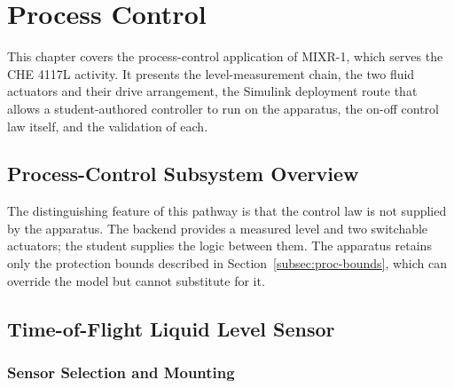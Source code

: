 
\chapter{Process Control}
\label{ch:process}

\ifpdf
    \graphicspath{{Chapter6/Figs/Raster/}{Chapter6/Figs/PDF/}{Chapter6/Figs/}}
\else
    \graphicspath{{Chapter6/Figs/Vector/}{Chapter6/Figs/}}
\fi

This chapter covers the process-control application of MIXR-1, which serves the CHE 4117L activity. It presents the level-measurement chain, the two fluid actuators and their drive arrangement, the Simulink deployment route that allows a student-authored controller to run on the apparatus, the on-off control law itself, and the validation of each.

\section{Process-Control Subsystem Overview}
\label{sec:proc-overview}


The distinguishing feature of this pathway is that the control law is not supplied by the apparatus. The backend provides a measured level and two switchable actuators; the student supplies the logic between them. The apparatus retains only the protection bounds described in Section~\ref{subsec:proc-bounds}, which can override the model but cannot substitute for it.

\section{Time-of-Flight Liquid Level Sensor}
\label{sec:proc-tof}

\subsection{Sensor Selection and Mounting}
\label{subsec:proc-tof-sel}

